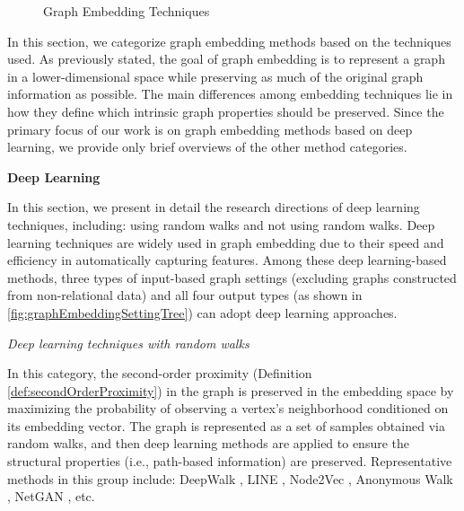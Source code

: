 \begin{figure}[htp]
{
	}
	\caption{Graph Embedding Techniques}
	\label{fig:graphEmbeddingTechniquesTree}
\end{figure}

In this section, we categorize graph embedding methods based on the techniques used. As previously stated, the goal of graph embedding is to represent a graph in a lower-dimensional space while preserving as much of the original graph information as possible. The main differences among embedding techniques lie in how they define which intrinsic graph properties should be preserved. Since the primary focus of our work is on graph embedding methods based on deep learning, we provide only brief overviews of the other method categories.


\textbf{Deep Learning}

In this section, we present in detail the research directions of deep learning techniques, including: using random walks and not using random walks. Deep learning techniques are widely used in graph embedding due to their speed and efficiency in automatically capturing features. Among these deep learning-based methods, three types of input-based graph settings (excluding graphs constructed from non-relational data) and all four output types (as shown in \autoref{fig:graphEmbeddingSettingTree}) can adopt deep learning approaches.

\textit{Deep learning techniques with random walks}

In this category, the second-order proximity (Definition \ref{def:secondOrderProximity}) in the graph is preserved in the embedding space by maximizing the probability of observing a vertex's neighborhood conditioned on its embedding vector. The graph is represented as a set of samples obtained via random walks, and then deep learning methods are applied to ensure the structural properties (i.e., path-based information) are preserved. Representative methods in this group include: DeepWalk \cite{perozzi2014deepwalk}, LINE \cite{tang2015line}, Node2Vec \cite{grover2016node2vec}, Anonymous Walk \cite{ivanov2018anonymous}, NetGAN \cite{bojchevski2018netgan}, etc.


